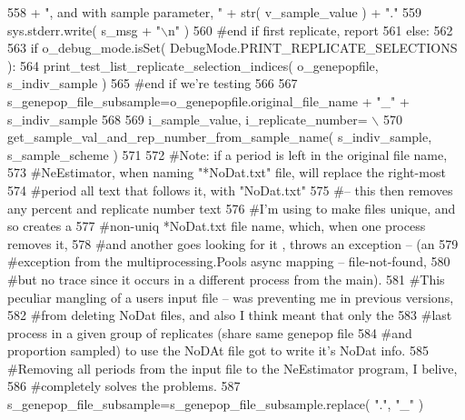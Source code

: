 \begin{DoxyCode}
558                         + \textcolor{stringliteral}{", and with sample parameter, "} + str( v\_sample\_value ) + \textcolor{stringliteral}{"."}
559                 sys.stderr.write( s\_msg + \textcolor{stringliteral}{"\(\backslash\)n"} )
560             \textcolor{comment}{#end if first replicate, report}
561         \textcolor{keywordflow}{else}:
562 
563             \textcolor{keywordflow}{if} o\_debug\_mode.isSet( DebugMode.PRINT\_REPLICATE\_SELECTIONS ):
564                 print\_test\_list\_replicate\_selection\_indices( o\_genepopfile, s\_indiv\_sample )
565             \textcolor{comment}{#end if we're testing}
566                 
567             s\_genepop\_file\_subsample=o\_genepopfile.original\_file\_name + \textcolor{stringliteral}{"\_"} +  s\_indiv\_sample
568 
569             i\_sample\_value, i\_replicate\_number= \(\backslash\)
570                         get\_sample\_val\_and\_rep\_number\_from\_sample\_name( s\_indiv\_sample, s\_sample\_scheme )
571 
572             \textcolor{comment}{#Note: if a period is left in the original file name,}
573             \textcolor{comment}{#NeEstimator, when naming "*NoDat.txt" file, will replace the right-most}
574             \textcolor{comment}{#period all text that follows it,  with "NoDat.txt" }
575             \textcolor{comment}{#-- this then removes any percent and replicate number text }
576             \textcolor{comment}{#I'm using to make files unique, and so creates a }
577             \textcolor{comment}{#non-uniq *NoDat.txt file name, which, when one process removes it, }
578             \textcolor{comment}{#and another goes looking for it , throws an exception -- (an }
579             \textcolor{comment}{#exception from the multiprocessing.Pools async mapping -- file-not-found,}
580             \textcolor{comment}{#but no trace since it occurs in a different process from the main).}
581             \textcolor{comment}{#This peculiar mangling of a users input file -- was preventing me in previous versions, }
582             \textcolor{comment}{#from deleting NoDat files, and also I think meant that only the }
583             \textcolor{comment}{#last process in a given group of replicates (share same genepop file}
584             \textcolor{comment}{#and proportion sampled) to use the NoDAt file got to write it's NoDat info. }
585             \textcolor{comment}{#Removing all periods from the input file to the NeEstimator program, I belive,}
586             \textcolor{comment}{#completely solves the problems.}
587             s\_genepop\_file\_subsample=s\_genepop\_file\_subsample.replace( \textcolor{stringliteral}{"."}, \textcolor{stringliteral}{"\_"} )

\end{DoxyCode}
